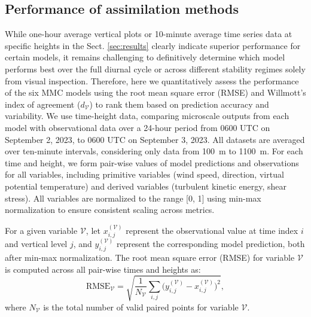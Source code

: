 \subsection{Performance of assimilation methods}
While one-hour average vertical plots or 10-minute average time series data at specific heights in the Sect. \ref{sec:results} clearly indicate superior performance for certain models, it remains challenging to definitively determine which model performs best over the full diurnal cycle or across different stability regimes solely from visual inspection. Therefore, here we quantitatively assess the performance of the six MMC models using the root mean square error (RMSE) and Willmott’s index of agreement ($d_{\mathcal{V}}$) \citep{willmott1981validation} to rank them based on prediction accuracy and variability. We use time-height data, comparing microscale outputs from each model with observational data over a 24-hour period from 0600 UTC on September 2, 2023, to 0600 UTC on September 3, 2023. All datasets are averaged over ten-minute intervals, considering only data from 100~m to 1100~m. For each time and height, we form pair-wise values of model predictions and observations for all variables, including primitive variables (wind speed, direction, virtual potential temperature) and derived variables (turbulent kinetic energy, shear stress). All variables are normalized to the range [0, 1] using min-max normalization to ensure consistent scaling across metrics.

For a given variable $\mathcal{V}$, let $x_{i,j}^{(\mathcal{V})}$ represent the observational value at time index $i$ and vertical level $j$, and $y_{i,j}^{(\mathcal{V})}$ represent the corresponding model prediction, both after min-max normalization. The root mean square error (RMSE) for variable $\mathcal{V}$ is computed across all pair-wise times and heights as:
\begin{equation}
    \text{RMSE}_\mathcal{V} = \sqrt{\frac{1}{N_\mathcal{V}} \sum_{i,j} \big(y_{i,j}^{(\mathcal{V})} - x_{i,j}^{(\mathcal{V})}\big)^2},
    \label{eq:rmse}
\end{equation}
where $N_\mathcal{V}$ is the total number of valid paired points for variable $\mathcal{V}$.


